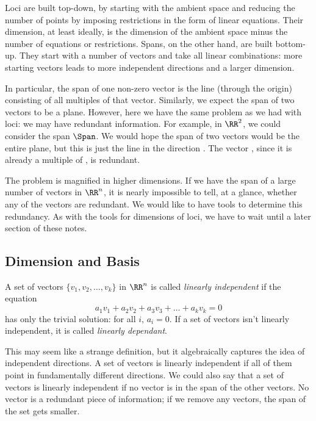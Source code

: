\documentclass[fleqn]{report}
\begin{document}
Loci are built top-down, by starting with the ambient space
and reducing the number of points by imposing restrictions in the
form of linear equations. Their dimension, at least ideally, is
the dimension of the ambient space minus the number of equations
or restrictions. Spans, on the other hand, are built bottom-up.
They start with a number of vectors and take all linear
combinations: more starting vectors leads to more independent
directions and a larger dimension.

In particular, the span of one non-zero vector is the line
(through the origin) consisting of all multiples of that
vector. Similarly, we expect the span of two
vectors to be a plane. However, here we have the
same problem as we had with loci: we may have redundant
information. For example, in $\RR^2$, we could consider the
span $\Span$. We would hope the span of two
vectors would be the entire plane, but this is just the line in the
direction . The vector
, since it is already a multiple
of , is redundant.

The problem is magnified in higher dimensions. If we
have the span of a large number of vectors in $\RR^n$, it is
nearly impossible to tell, at a glance, whether any of the
vectors are redundant. We would like to have tools to determine
this redundancy. As with the tools for dimensions of loci, we
have to wait until a later section of these notes.

\subsection{Dimension and Basis}
\label{dimension-and-basis}

\begin{defn}
A set of vectors $\{v_1, v_2, \ldots, v_k\}$ in $\RR^n$ is
called \emph{linearly independent} if the equation
\begin{equation*}
a_1 v_1 + a_2 v_2 + a_3 v_3 + \ldots + a_k v_k = 0
\end{equation*}
has only the trivial solution: for all $i$, $a_i = 0$. If a set of
vectors isn't linearly independent, it is called \emph{linearly
dependant}.
\end{defn}

This may seem like a strange definition, but it
algebraically captures the idea of independent directions. A
set of vectors is linearly independent if all of them point in
fundamentally different directions. We could also say that a
set of vectors is linearly independent if no vector is in the
span of the other vectors. No vector is a
redundant piece of information; if we remove any vectors, the
span of the set gets smaller.
\end{document}
